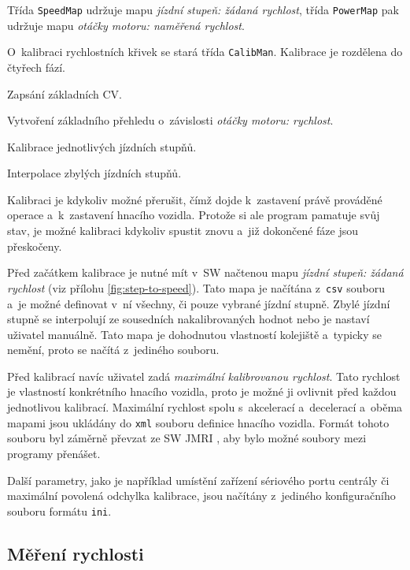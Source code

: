 Třída \texttt{SpeedMap} udržuje mapu \textit{jízdní stupeň: žádaná rychlost},
třída \texttt{Power\-Map} pak udržuje mapu \textit{otáčky motoru: naměřená rychlost}.

O~kalibraci rychlostních křivek se stará třída \texttt{CalibMan}. Kalibrace
je rozdělena do čtyřech fází.

\begin{compactenum}
\item Zapsání základních \gls{CV}.
\item Vytvoření základního přehledu o~závislosti \textit{otáčky motoru: rychlost}.
\item Kalibrace jednotlivých jízdních stupňů.
\item Interpolace zbylých jízdních stupňů.
\end{compactenum}

Kalibraci je kdykoliv možné přerušit, čímž dojde k~zastavení právě prováděné
operace a~k~zastavení hnacího vozidla. Protože si ale program pamatuje svůj
stav, je možné kalibraci kdykoliv spustit znovu a~již dokončené fáze jsou
přeskočeny.

Před začátkem kalibrace je nutné mít v~SW načtenou mapu \textit{jízdní
stupeň: žádaná rychlost} (viz přílohu \ref{fig:step-to-speed}). Tato mapa je
načítána z~\texttt{csv} souboru a~je možné definovat v~ní všechny, či pouze
vybrané jízdní stupně. Zbylé jízdní stupně se interpolují ze sousedních
nakalibrovaných hodnot nebo je nastaví uživatel manuálně. Tato mapa je
dohodnutou vlastností kolejiště a~typicky se nemění, proto se načítá z~jediného
souboru.

Před kalibrací navíc uživatel zadá \textit{maximální kalibrovanou rychlost}.
Tato rychlost je vlastností konkrétního hnacího vozidla, proto je možné ji
ovlivnit před každou jednotlivou kalibrací. Maximální rychlost spolu
s~akcelerací a~decelerací a~oběma mapami jsou ukládány do \texttt{xml} souboru
definice hnacího vozidla. Formát tohoto souboru byl záměrně převzat ze SW JMRI
\cite{jmri:web}, aby bylo možné soubory mezi programy přenášet.

Další parametry, jako je například umístění zařízení sériového portu centrály
či maximální povolená odchylka kalibrace, jsou načítány z~jediného
konfiguračního souboru formátu \texttt{ini}.

\subsection{Měření rychlosti}
\label{sec:ac:lt-measure}

